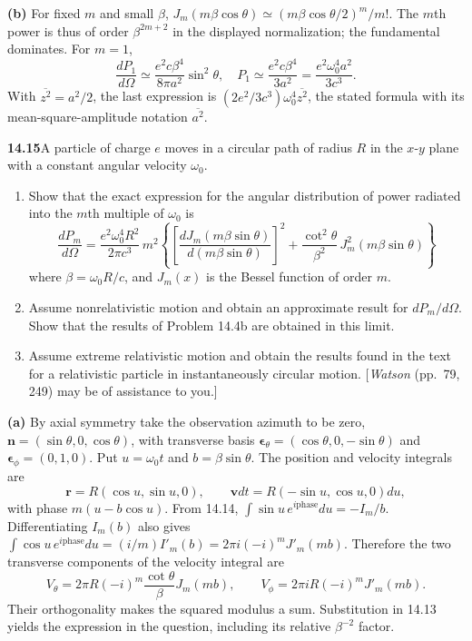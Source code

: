\textbf{(b)} For fixed $m$ and small $\beta$,
$J_m(m\beta\cos\theta)\simeq
(m\beta\cos\theta/2)^m/m!$. The $m$th power is thus of order
$\beta^{2m+2}$ in the displayed normalization; the fundamental dominates.
For $m=1$,
\[
\frac{dP_1}{d\Omega}\simeq
\frac{e^2c\beta^4}{8\pi a^2}\sin^2\theta,
\quad
P_1\simeq\frac{e^2c\beta^4}{3a^2}
=\frac{e^2\omega_0^4a^2}{3c^3}.
\]
With $\overline{z^2}=a^2/2$, the last expression is
$(2e^2/3c^3)\omega_0^4\overline{z^2}$, the stated formula with its
mean-square-amplitude notation $\overline{a^2}$.

\par\bigskip
\noindent\textbf{14.15}\quad A particle of charge $e$ moves in a circular path of radius $R$ in the $x$-$y$ plane with a constant angular velocity $\omega_{0}$.
\begin{enumerate}
\item[(a)] Show that the exact expression for the angular distribution of power radiated into the $m$th multiple of $\omega_{0}$ is
\[
\frac{dP_{m}}{d\Omega}=\frac{e^{2}\omega_{0}^{4}R^{2}}{2\pi c^{3}}\,m^{2}\!\left\{\left[\frac{dJ_{m}(m\beta\sin\theta)}{d(m\beta\sin\theta)}\right]^{2}+\frac{\cot^{2}\theta}{\beta^{2}}\,J_{m}^{2}(m\beta\sin\theta)\right\}
\]
where $\beta=\omega_{0}R/c$, and $J_{m}(x)$ is the Bessel function of order $m$.
\item[(b)] Assume nonrelativistic motion and obtain an approximate result for $dP_{m}/d\Omega$. Show that the results of Problem 14.4b are obtained in this limit.
\item[(c)] Assume extreme relativistic motion and obtain the results found in the text for a relativistic particle in instantaneously circular motion. [\emph{Watson} (pp.~79, 249) may be of assistance to you.]
\end{enumerate}
\solution

\textbf{(a)} By axial symmetry take the observation azimuth to be zero,
$\mathbf n=(\sin\theta,0,\cos\theta)$, with transverse basis
$\boldsymbol\epsilon_\theta=(\cos\theta,0,-\sin\theta)$ and
$\boldsymbol\epsilon_\phi=(0,1,0)$. Put $u=\omega_0t$ and
$b=\beta\sin\theta$. The position and velocity integrals are
\[
\mathbf r=R(\cos u,\sin u,0),\qquad
\mathbf vdt=R(-\sin u,\cos u,0)du,
\]
with phase $m(u-b\cos u)$.
From 14.14, $\int\sin u\,e^{i\mathrm{phase}}du=-I_m/b$.
Differentiating $I_m(b)$ also gives
$\int\cos u\,e^{i\mathrm{phase}}du=(i/m)I'_m(b)
=2\pi i(-i)^mJ'_m(mb)$. Therefore the two transverse components of
the velocity integral are
\[
V_\theta=2\pi R(-i)^m\frac{\cot\theta}{\beta}J_m(mb),\qquad
V_\phi=2\pi iR(-i)^mJ'_m(mb).
\]
Their orthogonality makes the squared modulus a sum. Substitution in
14.13 yields the expression in the question, including its relative
$\beta^{-2}$ factor.

